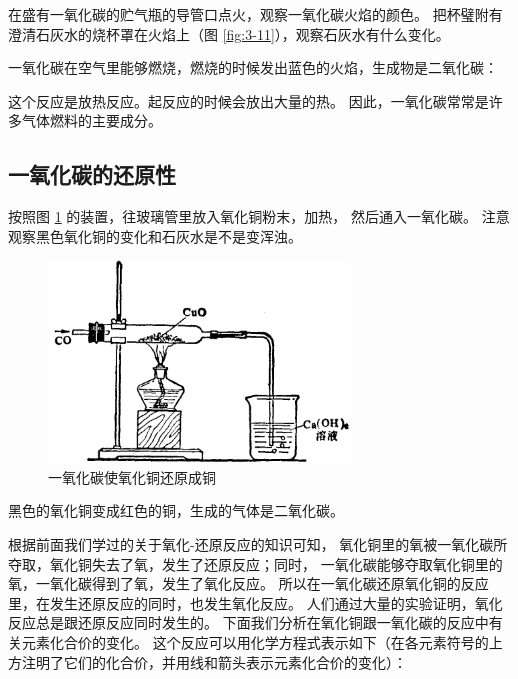 \begin{shiyan}
    在盛有一氧化碳的贮气瓶的导管口点火，观察一氧化碳火焰的颜色。
    把杯璧附有澄清石灰水的烧杯罩在火焰上（图 \ref{fig:3-11}），观察石灰水有什么变化。
\end{shiyan}


一氧化碳在空气里能够燃烧，燃烧的时候发出蓝色的火焰，生成物是二氧化碳：
\begin{fangchengshi}
\end{fangchengshi}

这个反应是放热反应。起反应的时候会放出大量的热。
因此，一氧化碳常常是许多气体燃料的主要成分。


\subsection{一氧化碳的还原性}

\begin{shiyan}
    按照图 \ref{fig:3-12} 的装置，往玻璃管里放入氧化铜粉末，加热， 然后通入一氧化碳。
    注意观察黑色氧化铜的变化和石灰水是不是变浑浊。
\end{shiyan}

\begin{figure}[htbp]
    \centering
    \includegraphics[width=8cm]{../pic/czhx1-ch3-12}
    \caption{一氧化碳使氧化铜还原成铜}\label{fig:3-12}
\end{figure}


黑色的氧化铜变成红色的铜，生成的气体是二氧化碳。

根据前面我们学过的关于氧化-还原反应的知识可知，
氧化铜里的氧被一氧化碳所夺取，氧化铜失去了氧，发生了还原反应；同时，
一氧化碳能够夺取氧化铜里的氧，一氧化碳得到了氧，发生了氧化反应。
所以在一氧化碳还原氧化铜的反应里，在发生还原反应的同时，也发生氧化反应。
人们通过大量的实验证明，氧化反应总是跟还原反应同时发生的。
下面我们分析在氧化铜跟一氧化碳的反应中有关元素化合价的变化。
这个反应可以用化学方程式表示如下（在各元素符号的上方注明了它们的化合价，并用线和箭头表示元素化合价的变化）：

